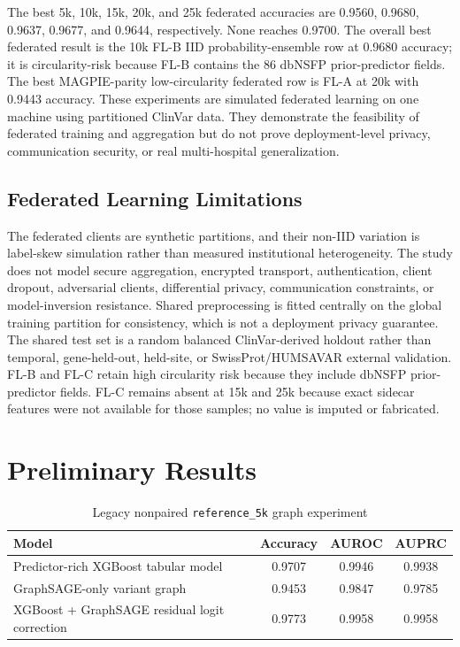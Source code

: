 \documentclass[conference]{IEEEtran}
\begin{document}
The best 5k, 10k, 15k, 20k, and 25k federated accuracies are 0.9560, 0.9680, 0.9637, 0.9677, and 0.9644, respectively. None reaches 0.9700. The overall best federated result is the 10k FL-B IID probability-ensemble row at 0.9680 accuracy; it is circularity-risk because FL-B contains the 86 dbNSFP prior-predictor fields. The best MAGPIE-parity low-circularity federated row is FL-A at 20k with 0.9443 accuracy. These experiments are simulated federated learning on one machine using partitioned ClinVar data. They demonstrate the feasibility of federated training and aggregation but do not prove deployment-level privacy, communication security, or real multi-hospital generalization.

\subsection{Federated Learning Limitations}
The federated clients are synthetic partitions, and their non-IID variation is label-skew simulation rather than measured institutional heterogeneity. The study does not model secure aggregation, encrypted transport, authentication, client dropout, adversarial clients, differential privacy, communication constraints, or model-inversion resistance. Shared preprocessing is fitted centrally on the global training partition for consistency, which is not a deployment privacy guarantee. The shared test set is a random balanced ClinVar-derived holdout rather than temporal, gene-held-out, held-site, or SwissProt/HUMSAVAR external validation. FL-B and FL-C retain high circularity risk because they include dbNSFP prior-predictor fields. FL-C remains absent at 15k and 25k because exact sidecar features were not available for those samples; no value is imputed or fabricated.

\section{Preliminary Results}
\begin{table}[t]
\centering
\caption{Legacy nonpaired \texttt{reference\_5k} graph experiment}
\begin{tabular}{lccc}
\toprule
Model & Accuracy & AUROC & AUPRC \\
\midrule
Predictor-rich XGBoost tabular model & 0.9707 & 0.9946 & 0.9938 \\
GraphSAGE-only variant graph & 0.9453 & 0.9847 & 0.9785 \\
XGBoost + GraphSAGE residual logit correction & 0.9773 & 0.9958 & 0.9958 \\
\bottomrule
\end{tabular}
\end{table}
\end{document}
